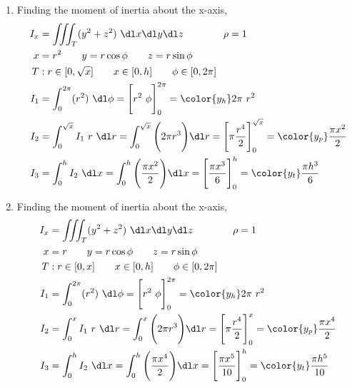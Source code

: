 \begin{enumerate}
    \item Finding the moment of inertia about the x-axis,
          \begin{align}
              I_x & = \iiint_T (y^2 + z^2)\ \dl x \dl y \dl z \qquad\qquad \rho = 1 \\
              x   & = r^2 \qquad y = r \cos \phi \qquad z = r \sin \phi             \\
              T   & : r \in [0, \sqrt{x}] \qquad x \in [0, h]
              \qquad \phi \in [0, 2\pi]                                             \\
              I_1 & = \int_{0}^{2\pi} (r^2) \ \dl \phi
              = \Bigg[ r^2\ \phi \Bigg]_{0}^{2\pi}
              = {\color{y_h} 2\pi\ r^2}                                             \\
              I_2 & = \int_{0}^{\sqrt{x}} I_1 \ r\ \dl r
              = \int_{0}^{\sqrt{x}} \Bigg( 2\pi r^3 \Bigg) \dl r
              = \Bigg[ \pi \frac{r^4}{2} \Bigg]_{0}^{\sqrt{x}}
              = {\color{y_p} \frac{\pi x^2}{2} }                                    \\
              I_3 & = \int_{0}^{h} I_2\ \dl x = \int_{0}^{h}
              \Bigg( \frac{\pi x^2}{2} \Bigg) \dl x
              = \Bigg[ \frac{\pi x^3}{6} \Bigg]_{0}^{h}
              = {\color{y_t} \frac{\pi h^3}{6}}
          \end{align}

    \item Finding the moment of inertia about the x-axis,
          \begin{align}
              I_x & = \iiint_T (y^2 + z^2)\ \dl x \dl y \dl z \qquad\qquad \rho = 1 \\
              x   & = r \qquad y = r \cos \phi \qquad z = r \sin \phi               \\
              T   & : r \in [0, x] \qquad x \in [0, h]
              \qquad \phi \in [0, 2\pi]                                             \\
              I_1 & = \int_{0}^{2\pi} (r^2) \ \dl \phi
              = \Bigg[ r^2\ \phi \Bigg]_{0}^{2\pi}
              = {\color{y_h} 2\pi\ r^2}                                             \\
              I_2 & = \int_{0}^{x} I_1 \ r\ \dl r
              = \int_{0}^{x} \Bigg( 2\pi r^3 \Bigg) \dl r
              = \Bigg[ \pi \frac{r^4}{2} \Bigg]_{0}^{x}
              = {\color{y_p} \frac{\pi x^4}{2} }                                    \\
              I_3 & = \int_{0}^{h} I_2\ \dl x = \int_{0}^{h}
              \Bigg( \frac{\pi x^4}{2} \Bigg) \dl x
              = \Bigg[ \frac{\pi x^5}{10} \Bigg]_{0}^{h}
              = {\color{y_t} \frac{\pi h^5}{10}}
          \end{align}


\end{enumerate}
